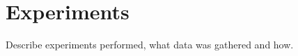 
\chapter{Experiments}
Describe experiments performed, what data was gathered and how.
\cleardoublepage